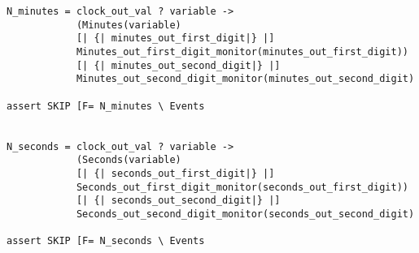 \begin{verbatim}
N_minutes = clock_out_val ? variable ->
            (Minutes(variable)
            [| {| minutes_out_first_digit|} |]
            Minutes_out_first_digit_monitor(minutes_out_first_digit))
            [| {| minutes_out_second_digit|} |]
            Minutes_out_second_digit_monitor(minutes_out_second_digit)

assert SKIP [F= N_minutes \ Events


N_seconds = clock_out_val ? variable ->
            (Seconds(variable)
            [| {| seconds_out_first_digit|} |]
            Seconds_out_first_digit_monitor(seconds_out_first_digit))
            [| {| seconds_out_second_digit|} |]
            Seconds_out_second_digit_monitor(seconds_out_second_digit)

assert SKIP [F= N_seconds \ Events

\end{verbatim}
